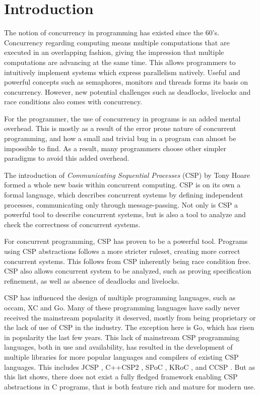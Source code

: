 
\chapter{Introduction}
\label{ch:introduction}

The notion of concurrency in programming has existed since the 60's. Concurrency regarding computing means multiple computations that are executed in an overlapping fashion, giving the impression that multiple computations are advancing at the same time. This allows programmers to intuitively implement systems which express parallelism natively. Useful and powerful concepts such as semaphores, monitors and threads forms its basis on concurrency. However, new potential challenges such as deadlocks, livelocks and race conditions also comes with concurrency.

For the programmer, the use of concurrency in programs is an added mental overhead. This is mostly as a result of the error prone nature of concurrent programming, and how a small and trivial bug in a program can almost be impossible to find. As a result, many programmers choose other simpler paradigms to avoid this added overhead.

The introduction of \textit{Communicating Sequential Processes} (CSP) by Tony Hoare \citep{csp} formed a whole new basis within concurrent computing. CSP is on its own a formal language, which describes concurrent systems by defining independent processes, communicating only through message-passing. Not only is CSP a powerful tool to describe concurrent systems, but is also a tool to analyze and check the correctness of concurrent systems. 

For concurrent programming, CSP has proven to be a powerful tool. Programs using CSP abstractions follows a more stricter ruleset, creating more correct concurrent systems. This follows from CSP inherently being race condition free. CSP also allows concurrent system to be analyzed, such as proving specification refinement, as well as absence of deadlocks and livelocks.

CSP has influenced the design of multiple programming languages, such as occam, XC and Go. Many of these programming languages have sadly never received the mainstream popularity it deserved, mostly from being proprietary or the lack of use of CSP in the industry. The exception here is Go, which has risen in popularity the last few years. This lack of mainstream CSP programming languages, both in use and availability, has resulted in the development of multiple libraries for more popular languages and compilers of existing CSP languages. This includes JCSP \citep{jcsp}, C++CSP2 \citep{c++csp2}, SPoC \citep{spoc}, KRoC \citep{kroc}, and CCSP \citep{ccsp}. But as this list shows, there does not exist a fully fledged framework enabling CSP abstractions in C programs, that is both feature rich and mature for modern use.

